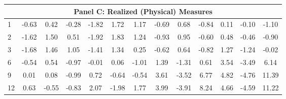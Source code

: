 \documentclass[11pt]{article}
\begin{document}
\begin{table}
\begin{center}
\begin{tabular}{lllllllllllll}
\hline
\multicolumn{13}{c}{Panel C: Realized (Physical) Measures} \\
\hline
1 & \multicolumn{1}{c}{-0.63} & \multicolumn{1}{c}{0.42} & \multicolumn{1}{c}{-0.28} & \multicolumn{1}{c}{-1.82} & \multicolumn{1}{c}{1.72} & \multicolumn{1}{c}{1.17} & \multicolumn{1}{c}{-0.69} & \multicolumn{1}{c}{0.68} & \multicolumn{1}{c}{-0.84} & \multicolumn{1}{c}{0.11} & \multicolumn{1}{c}{-0.10} & \multicolumn{1}{c}{-1.10} \\
2 & \multicolumn{1}{c}{-1.62} & \multicolumn{1}{c}{1.50} & \multicolumn{1}{c}{0.51} & \multicolumn{1}{c}{-1.92} & \multicolumn{1}{c}{1.83} & \multicolumn{1}{c}{1.24} & \multicolumn{1}{c}{-0.93} & \multicolumn{1}{c}{0.95} & \multicolumn{1}{c}{-0.60} & \multicolumn{1}{c}{0.48} & \multicolumn{1}{c}{-0.46} & \multicolumn{1}{c}{-0.90} \\
3 & \multicolumn{1}{c}{-1.68} & \multicolumn{1}{c}{1.46} & \multicolumn{1}{c}{1.05} & \multicolumn{1}{c}{-1.41} & \multicolumn{1}{c}{1.34} & \multicolumn{1}{c}{0.25} & \multicolumn{1}{c}{-0.62} & \multicolumn{1}{c}{0.64} & \multicolumn{1}{c}{-0.82} & \multicolumn{1}{c}{1.27} & \multicolumn{1}{c}{-1.24} & \multicolumn{1}{c}{-0.02} \\
6 & \multicolumn{1}{c}{-0.54} & \multicolumn{1}{c}{0.54} & \multicolumn{1}{c}{-0.97} & \multicolumn{1}{c}{-0.01} & \multicolumn{1}{c}{0.06} & \multicolumn{1}{c}{-1.01} & \multicolumn{1}{c}{1.39} & \multicolumn{1}{c}{-1.31} & \multicolumn{1}{c}{0.61} & \multicolumn{1}{c}{3.54} & \multicolumn{1}{c}{-3.49} & \multicolumn{1}{c}{6.14} \\
9 & \multicolumn{1}{c}{0.01} & \multicolumn{1}{c}{0.08} & \multicolumn{1}{c}{-0.99} & \multicolumn{1}{c}{0.72} & \multicolumn{1}{c}{-0.64} & \multicolumn{1}{c}{-0.54} & \multicolumn{1}{c}{3.61} & \multicolumn{1}{c}{-3.52} & \multicolumn{1}{c}{6.77} & \multicolumn{1}{c}{4.82} & \multicolumn{1}{c}{-4.76} & \multicolumn{1}{c}{11.39} \\
12 & \multicolumn{1}{c}{0.63} & \multicolumn{1}{c}{-0.55} & \multicolumn{1}{c}{-0.83} & \multicolumn{1}{c}{2.07} & \multicolumn{1}{c}{-1.98} & \multicolumn{1}{c}{1.77} & \multicolumn{1}{c}{3.99} & \multicolumn{1}{c}{-3.91} & \multicolumn{1}{c}{8.24} & \multicolumn{1}{c}{4.66} & \multicolumn{1}{c}{-4.59} & \multicolumn{1}{c}{11.22} \\
\hline
\end{tabular}
  \end{center}

\end{table}
\end{document}
